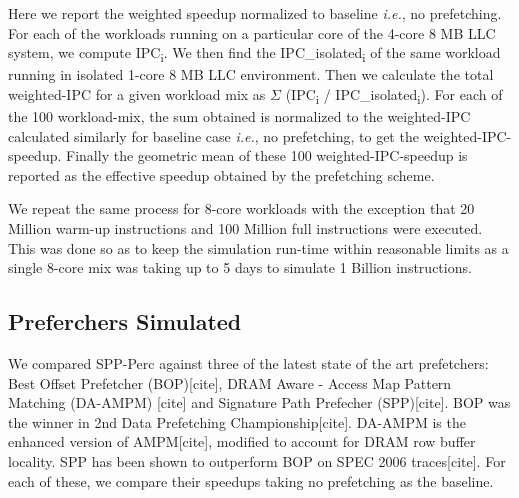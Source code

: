 \documentclass{sig-alternate}
\begin{document}
Here we report the weighted speedup normalized to baseline \textit{i.e.}, no prefetching. 
For each of the workloads running on a particular core of the 4-core 8 MB LLC system, we compute IPC\textsubscript{i}. 
We then find the IPC\_isolated\textsubscript{i} of the same workload running in isolated 1-core 8 MB LLC environment. 
Then we calculate the total weighted-IPC for a given workload mix as $\Sigma$ (IPC\textsubscript{i} / IPC\_isolated\textsubscript{i}). 
For each of the 100 workload-mix, the sum obtained is normalized to the weighted-IPC calculated similarly for baseline case \textit{i.e.}, no prefetching, to get the weighted-IPC-speedup. 
Finally the geometric mean of these 100 weighted-IPC-speedup is reported as the effective speedup obtained by the prefetching scheme.

We repeat the same process for 8-core workloads with the exception that 20 Million warm-up instructions and 100 Million full instructions were executed.
This was done so as to keep the simulation run-time within reasonable limits as a single 8-core mix was taking up to 5 days to simulate 1 Billion instructions.

\subsection{Preferchers Simulated}
We compared SPP-Perc against three of the latest state of the art prefetchers: Best Offset Prefetcher (BOP)[cite], DRAM Aware - Access Map Pattern Matching (DA-AMPM) [cite] and Signature Path Prefecher (SPP)[cite]. 
BOP was the winner in 2nd Data Prefetching Championship[cite]. 
DA-AMPM is the enhanced version of AMPM[cite], modified to account for DRAM row buffer locality. 
SPP has been shown to outperform BOP on SPEC 2006 traces[cite]. 
For each of these, we compare their speedups taking no prefetching as the baseline.
\end{document}
